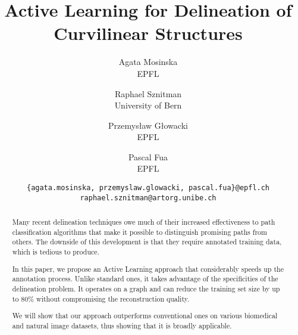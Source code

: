 \documentclass[10pt,twocolumn,letterpaper]{article}
\begin{document}
\title{Active Learning for Delineation of Curvilinear Structures}

\author{Agata Mosinska\\
EPFL\\
\and
Raphael Sznitman\\
University of Bern\\
\and
Przemys\l{}aw G\l{}owacki\\
EPFL\\
\and
Pascal Fua\\
EPFL\\
\and
{\tt\small  \{agata.mosinska, przemyslaw.glowacki, pascal.fua\}@epfl.ch raphael.sznitman@artorg.unibe.ch} 
}
\maketitle

\begin{abstract}
Many recent delineation techniques owe  much of their increased effectiveness to
path classification  algorithms that  make it possible to distinguish  promising paths
from others.   The downside of this  development is that they  require annotated
training data, which is tedious to produce.

In this paper,  we propose an Active Learning approach  that considerably speeds
up  the annotation  process. Unlike  standard ones,  it takes  advantage of  the
specificities of the delineation problem. It  operates on a graph and can reduce
the training  set size  by up  to 80\%  without compromising  the reconstruction
quality.

We  will  show  that  our  approach outperforms  conventional  ones  on  various
biomedical  and  natural  image  datasets,  thus  showing  that  it  is  broadly
applicable.
\end{abstract}

\end{document}

